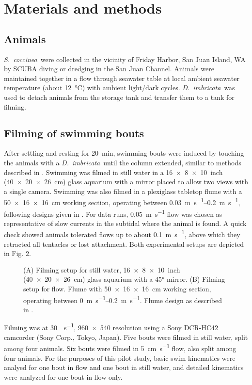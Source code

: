 \documentclass[10pt]{article}
\newcommand{\Genus}[1]{\emph{#1}}
\newcommand{\Stomphia}{\Genus{S.~coccinea}}
\newcommand{\Dimbricata}{\Genus{D.~imbricata}}
\begin{document}
\section*{Materials and methods}
\subsection*{Animals}
	\Stomphia\ were collected in the vicinity of Friday Harbor, San Juan Island, WA by SCUBA diving or dredging in the San Juan Channel.  Animals were maintained together in a flow through seawater table at local ambient seawater temperature (about \SI{12}{\celsius}) with ambient light/dark cycles.  \Dimbricata\ was used to detach animals from the storage tank and transfer them to a tank for filming.   

\subsection*{Filming of swimming bouts}
	After settling and resting for \SI{20}{\minute}, swimming bouts were induced by touching the animals with a \Dimbricata\ until the column extended, similar to methods described in \citep{Sund:1958}.  Swimming was filmed in still water in a \SI{16 x 8 x 10}{inch} (\SI{40 x 20 x 26}{\centi\meter}) glass aquarium with a mirror placed to allow two views with a single camera.  Swimming was also filmed in a plexiglass tabletop flume with a \SI{50 x 16 x 16}{\centi\meter} working section, operating between \SIrange{0.03}{0.2}{\meter\per\second}, following designs given in \citep{LaBarbera:1978}.  For data runs, \SI{0.05}{\meter\per\second} flow was chosen as representative of slow currents in the subtidal where the animal is found.  A quick check showed animals tolerated flows up to about \SI{0.1}{\meter\per\second}, above which they retracted all tentacles or lost attachment.  Both experimental setups are depicted in Fig. 2. 

\begin{figure}
\caption{ (A) Filming setup for still water, \SI{16 x 8 x 10}{inch} (\SI{40 x 20 x 26}{\centi\meter}) glass aquarium with a \ang{45} mirror.  (B) Filming setup for flow.  Flume with \SI{50 x 16 x 16}{\centi\meter} working section, operating between \SIrange{0}{0.2}{\meter\per\second}.  Flume design as described in \citep{LaBarbera:1978}.}
\label{fig:2}
\end{figure}
	
Filming was at \SI{30}{\frame\per\second}, \SI{960 x 540}{\pixel} resolution using a Sony DCR-HC42 camcorder (Sony Corp., Tokyo, Japan).    Five bouts were filmed in still water, split among four animals.  Six bouts were filmed in \SI{5}{\centi\meter\per\second} flow, also split among four animals.  For the purposes of this pilot study, basic swim kinematics were analyed for one bout in flow and one bout in still water, and detailed kinematics were analyzed for one bout in flow only. 
\end{document}
